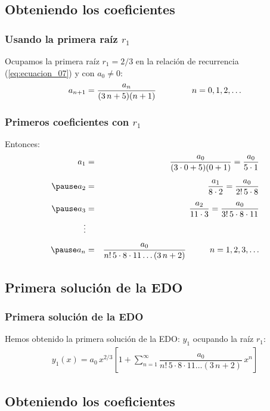 \documentclass[12pt]{beamer}
\begin{document}
\subsection*{Obteniendo los coeficientes}

\begin{frame}
\frametitle{Usando la primera raíz $r_{1}$}
Ocupamos la primera raíz $r_{1} = 2/3$ en la relación de recurrencia (\ref{eq:ecuacion_07}) y con $a_{0} \neq 0$:
\begin{align}
a_{n+1} = \dfrac{a_{n}}{(3 \, n + 5)(n + 1)} \hspace{1.5cm} n = 0, 1, 2, \ldots
\label{eq:ecuacion_08}    
\end{align}
\end{frame}
\begin{frame}
\frametitle{Primeros coeficientes con $r_{1}$}
Entonces:
\begin{eqnarray*}
a_{1} &=& \dfrac{a_{0}}{(3 \cdot 0 + 5)(0 + 1)}  = \dfrac{a_{0}}{5 \cdot 1} \\[0.5em] \pause
a_{2} &=& \dfrac{a_{1}}{8 \cdot 2} = \dfrac{a_{0}}{2! \, 5 \cdot 8} \\[0.5em] \pause
a_{3} &=& \dfrac{a_{2}}{11 \cdot 3} = \dfrac{a_{0}}{3! \, 5 \cdot 8 \cdot 11} \\
\vdots \\[0.5em] \pause
a_{n} &=& \dfrac{a_{0}}{n! \, 5 \cdot 8 \cdot 11 \ldots (3\, n + 2)} \hspace{1cm} n = 1, 2, 3, \ldots
\end{eqnarray*}
\end{frame}

\subsection*{Primera solución de la EDO}

\begin{frame}
\frametitle{Primera solución de la EDO}
Hemos obtenido la primera solución de la EDO: $y_{1}$ ocupando la raíz $r_{1}$:
\begin{align}
y_{1}(x) = a_{0} \, x^{2/3} \left[ 1 + \sum_{n=1}^{\infty} \dfrac{a_{0}}{n! \, 5 \cdot 8 \cdot 11 \ldots (3\, n + 2)} \, x^{n} \right]
\label{eq:ecuacion_10}    
\end{align}
\end{frame}

\subsection*{Obteniendo los coeficientes}
\end{document}
